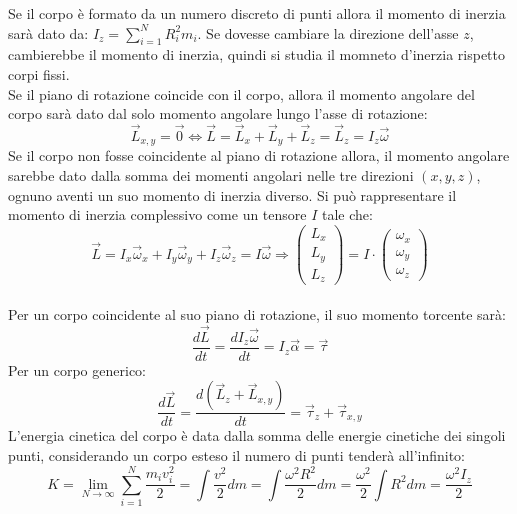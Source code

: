 \documentclass{article}
\numberwithin{equation}{subsection}
\begin{document}
Se il corpo è formato da un numero discreto di punti allora 
il momento di inerzia sarà dato da: $I_z=\displaystyle\sum_{i=1}^{N}R_i^2m_i$. 
Se dovesse cambiare la direzione dell'asse $z$, cambierebbe 
il momento di inerzia, quindi si studia il momneto d'inerzia 
rispetto corpi fissi. \\
Se il piano di rotazione coincide con il corpo, allora il 
momento angolare del corpo sarà dato dal solo momento angolare 
lungo l'asse di rotazione:
\begin{equation}
    \vec{L}_{x,y}=\vec{0}\iff\vec{L}=\vec{L}_x+\vec{L}_y+\vec{L}_z=\vec{L}_z=I_z\vec{\omega}
\end{equation}
Se il corpo non fosse coincidente al piano di rotazione allora, 
il momento angolare sarebbe dato dalla somma dei momenti angolari 
nelle tre direzioni $(x,y,z)$, ognuno aventi un suo momento 
di inerzia diverso. Si può rappresentare il momento di inerzia 
complessivo come un tensore $I$ tale che:
\begin{equation}
    \vec{L}=I_x\vec{\omega}_x+I_y\vec{\omega}_y+I_z\vec{\omega}_z=I\vec{\omega}\Rightarrow
    \begin{pmatrix}
        L_x\\
        L_y\\
        L_z
    \end{pmatrix}=I\cdot
    \begin{pmatrix}
        \omega_x\\
        \omega_y\\
        \omega_z
    \end{pmatrix}
\end{equation}\\
Per un corpo coincidente al suo piano di rotazione, il suo 
momento torcente sarà:
\begin{equation}
    \displaystyle\frac{d\vec{L}}{dt}=\frac{dI_z\vec{\omega}}{dt}=I_z\vec{\alpha}=\vec{\tau}
\end{equation}
Per un corpo generico:
\begin{equation}
    \displaystyle\frac{d\vec{L}}{dt}=\frac{d(\vec{L}_z+\vec{L}_{x,y})}{dt}=\vec{\tau}_z+\vec{\tau}_{x,y}
\end{equation}
L'energia cinetica del corpo è data dalla somma delle energie 
cinetiche dei singoli punti, considerando un corpo esteso il 
numero di punti tenderà all'infinito:
\begin{equation}
    K=\displaystyle\lim_{N\to\infty}\sum_{i=1}^{N}\frac{m_iv_i^2}{2}=\int\frac{v^2}{2}dm=\int\frac{\omega^2R^2}{2}dm=\frac{\omega^2}{2}\int R^2dm=\frac{\omega^2I_z}{2}
\end{equation}
\end{document}
